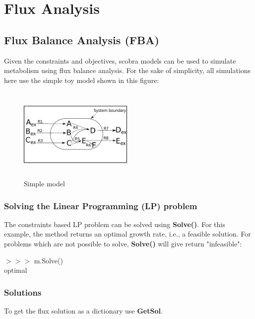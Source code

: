 \chapter{Flux Analysis}

\section{Flux Balance Analysis (FBA)}

Given the constraints and objectives, scobra models can be used to simulate metabolism using flux balance analysis. For the sake of simplicity, all simulations here use the simple toy model shown in this figure:

\begin{figure}[h]
\centering
\includegraphics[height=4.5cm, width=5.5cm]{./img/Flux_analysis/scr_res.pdf}
\caption{Simple model}
\end{figure}


\subsection{Solving the Linear Programming (LP) problem}
The constraints based LP problem can be solved using \textbf{Solve()}. For this example, the method returns an optimal growth rate, i.e., a feasible solution. For problems which are not possible to solve, \textbf{Solve()} will give return "infeasible":

\begin{framed}
$>>>$ m.Solve()\\
optimal
\end{framed}


\subsection{Solutions}
To get the flux solution as a dictionary use \textbf{GetSol}.

